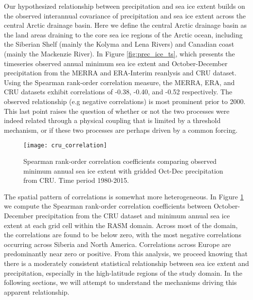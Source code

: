 Our hypothesized relationship between precipitation and sea ice extent builds on the observed interannual covariance of precipitation and sea ice extent across the central Arctic drainage basin.
Here we define the central Arctic drainage basin as the land areas draining to the core sea ice regions of the Arctic ocean, including the Siberian Shelf (mainly the Kolyma and Lena Rivers) and Canadian coast (mainly the Mackenzie River).
In Figure \ref{fig:prec_ice_ts}, which presents the timeseries observed annual minimum sea ice extent and October-December precipitation from the MERRA and ERA-Interim reanlysis and CRU dataset.
Using the Spearman rank-order correlation measure, the MERRA, ERA, and CRU datasets exhibit correlations of -0.38, -0.40, and -0.52 respectively.
The observed relationship (e.g negative correlations) is most prominent prior to 2000.
This last point raises the question of whether or not the two processes were indeed related through a physical coupling that is limited by a threshold mechanism, or if these two processes are perhaps driven by a common forcing.

\begin{figure}
  \centering
  \texttt{[image: cru\_correlation]}
  \caption{Spearman rank-order correlation coefficients comparing observed minimum annual sea ice extent with gridded Oct-Dec precipitation from CRU. Time period 1980-2015.}
  \label{fig:prec_spatial_corr}
\end{figure}

The spatial pattern of correlations is somewhat more heterogeneous.
In Figure \ref{fig:prec_spatial_corr} we compute the Spearman rank-order correlation coefficients between October-December precipitation from the CRU dataset and minimum annual sea ice extent at each grid cell within the RASM domain.
Across most of the domain, the correlations are found to be below zero, with the most negative correlations occurring across Siberia and North America.
Correlations across Europe are predominantly near zero or positive.
From this analysis, we proceed knowing that there is a moderately consistent statistical relationship between sea ice extent and precipitation, especially in the high-latitude regions of the study domain.
In the following sections, we will attempt to understand the mechanisms driving this apparent relationship.

